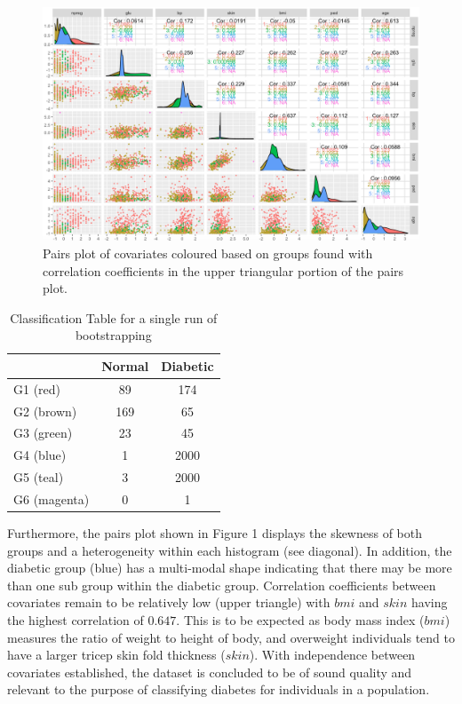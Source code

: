 \documentclass[12pt, centerh1]{article}
\begin{document}
\begin{figure}[!htb]
\label{dp_pairs}
\caption{Pairs plot of covariates coloured based on groups found with correlation coefficients in the upper triangular portion of the pairs plot.}
\includegraphics[scale=0.50]{dp_pairs}
\end{figure}



\begin{table}[!htb]
\centering
\label{tab_class}
\caption{Classification Table for a single run of bootstrapping}
\begin{tabular}{|l|cc|}
\hline
 & Normal & Diabetic \\ 
 \hline
G1 (red)     & 89     & 174      \\
G2 (brown)  & 169    & 65       \\
G3 (green)  & 23     & 45       \\
G4 (blue)  & 1      & 2000     \\
G5 (teal) & 3      & 2000     \\
G6 (magenta) & 0      & 1       \\
\hline
\end{tabular}
\end{table}


Furthermore, the pairs plot shown in Figure 1 displays the skewness of both groups and a heterogeneity within each histogram (see diagonal). In addition, the diabetic group (blue) has a multi-modal shape indicating that there may be more than one sub group within the diabetic group. Correlation coefficients between covariates remain to be relatively low (upper triangle) with $bmi$ and $skin$ having the highest correlation of $0.647$. This is to be expected as body mass index ($bmi$) measures the ratio of weight to height of body, and overweight individuals tend to have a larger tricep skin fold thickness ($skin$).  With independence between covariates established, the dataset is concluded to be of sound quality and relevant to the purpose of classifying diabetes for individuals in a population. 
\end{document}
